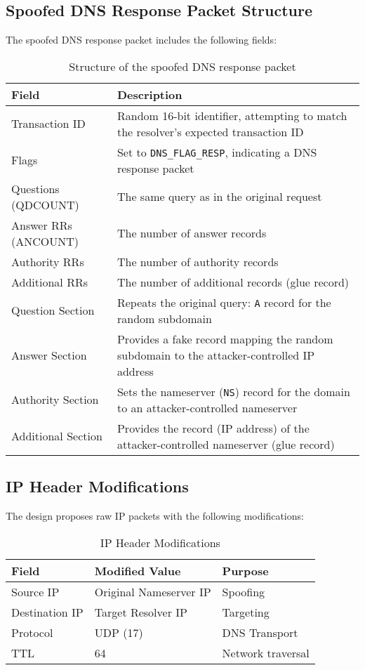\documentclass[12pt,a4paper]{article}
\begin{document}
\vspace{1em}

\subsection{Spoofed DNS Response Packet Structure}

The spoofed DNS response packet includes the following fields\cite{cert-dns}:

\begin{table}[H]
\centering
\begin{tabular}{|l|p{8cm}|}
\hline
\textbf{Field} & \textbf{Description} \\
\hline
Transaction ID & Random 16-bit identifier, attempting to match the resolver’s expected transaction ID \\
\hline
Flags & Set to \texttt{DNS\_FLAG\_RESP}, indicating a DNS response packet \\
\hline
Questions (QDCOUNT) & The same query as in the original request \\
\hline
Answer RRs (ANCOUNT) & The number of answer records \\
\hline
Authority RRs & The number of authority records \\
\hline
Additional RRs & The number of  additional records (glue record) \\
\hline
Question Section & Repeats the original query: \texttt{A} record for the random subdomain \\
\hline
Answer Section & Provides a fake  record mapping the random subdomain to the attacker-controlled IP address \\
\hline
Authority Section & Sets the nameserver (\texttt{NS}) record for the domain to an attacker-controlled nameserver \\
\hline
Additional Section & Provides the record (IP address) of the attacker-controlled nameserver (glue record) \\
\hline
\end{tabular}
\caption{Structure of the spoofed DNS response packet}
\end{table}


\subsection{IP Header Modifications}

The design proposes raw IP packets with the following modifications:

\begin{table}[H]
\centering
\begin{tabular}{|l|l|l|}
\hline
\textbf{Field} & \textbf{Modified Value} & \textbf{Purpose} \\
\hline
Source IP & Original Nameserver IP & Spoofing \\
Destination IP & Target Resolver IP & Targeting \\
Protocol & UDP (17) & DNS Transport \\
TTL & 64 & Network traversal \\
\hline
\end{tabular}
\caption{IP Header Modifications}
\label{tab:ip_header}
\end{table}
\end{document}
